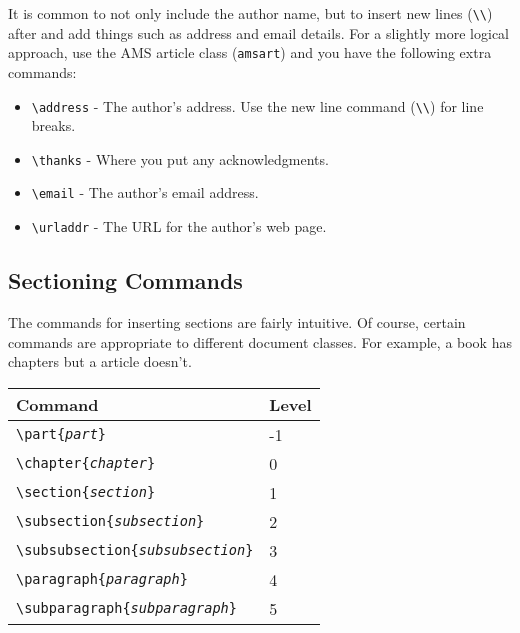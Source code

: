 \documentclass{article}
\begin{document}
    It is common to not only include the author name, but to insert new
    lines (\texttt{\textbackslash\textbackslash}) after and add things such
    as address and email details.  For a slightly more logical approach, use
    the AMS article class (\texttt{amsart}) and you have the following extra
    commands:
    \begin{itemize}
        \item \texttt{\textbackslash address} - The author's address.  Use
        the new line command (\texttt{\textbackslash\textbackslash}) for
        line breaks.
        \item \texttt{\textbackslash thanks} - Where you put any acknowledgments.
        \item \texttt{\textbackslash email} - The author's email address.
        \item \texttt{\textbackslash urladdr} - The URL for the author's web page.
    \end{itemize}

    \subsection{Sectioning Commands}
    The commands for inserting sections are fairly intuitive.  Of course,
    certain commands are appropriate to different document classes.
    For example, a book has chapters but a article doesn't.

    \begin{center}
        \begin{tabular}{| l | l |}

            \hline  %
            Command & Level \\ \hline  %
            \texttt{\textbackslash part\{\emph{part}\}} & -1 \\
            \texttt{\textbackslash chapter\{\emph{chapter}\}} & 0 \\
            \texttt{\textbackslash section\{\emph{section}\}} & 1 \\
            \texttt{\textbackslash subsection\{\emph{subsection}\}} & 2 \\
            \texttt{\textbackslash subsubsection\{\emph{subsubsection}\}} & 3 \\
            \texttt{\textbackslash paragraph\{\emph{paragraph}\}} & 4 \\
            \texttt{\textbackslash subparagraph\{\emph{subparagraph}\}} & 5 \\
            \hline
        \end{tabular}
    \end{center}
\end{document}
